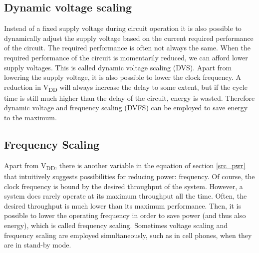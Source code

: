  \subsection{Dynamic voltage scaling}
 Instead of a fixed supply voltage during circuit operation it is also possible to dynamically 
 adjust the supply voltage based on the current required performance of the circuit. The required performance is often not always the same. When the required performance 
 of the circuit is momentarily reduced, we can afford lower supply voltages. This is called dynamic voltage scaling (DVS). Apart from lowering the supply 
 voltage, it is also possible to lower the clock frequency. A reduction in V\textsubscript{DD} will always 
 increase the delay to some extent, but if the cycle time is still much higher than the delay of the circuit, energy is wasted. Therefore dynamic voltage and frequency scaling (DVFS) can be employed to save energy to the maximum.
 
 \subsection{Frequency Scaling}
 Apart from V\textsubscript{DD}, there is another variable in the equation of section \ref{src_pwr} that intuitively 
 suggests possibilities for reducing power: frequency. Of course, the clock frequency is bound by the desired throughput of the system. However, a system does rarely operate at its maximum throughput all the time. Often, the desired throughput is much lower than its maximum performance. Then, it is possible to lower the operating frequency in order to save power (and thus also energy), which is called frequency scaling. Sometimes voltage scaling and frequency scaling are employed simultaneously, such as in cell phones, when they are in stand-by mode.
 
